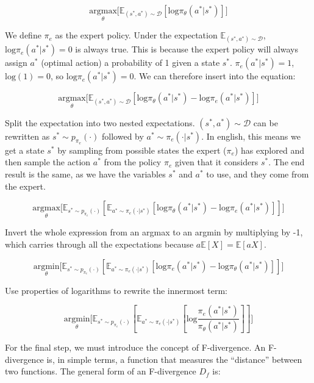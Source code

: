     $$\underset{\theta}{\textrm{argmax}}\biggl[\mathbb{E}_{(s^\ast,a^\ast) \sim \mathcal{D}}[\mathrm{log}\pi_\theta(a^\ast|s^\ast)]\biggr]$$

    We define $\pi_e$ as the expert policy. Under the expectation $\mathbb{E}_{(s^\ast,a^\ast) \sim \mathcal{D}}$, $\mathrm{log}\pi_e(a^\ast|s^\ast) = 0$ is always true. This is because the expert policy will always assign $a^\ast$ (optimal action) a probability of 1 given a state $s^\ast$. $\pi_e(a^\ast|s^\ast) = 1$, $\mathrm{log}(1) = 0$, so  $\mathrm{log}\pi_e(a^\ast|s^\ast) = 0$. We can therefore insert into the equation:

    $$\underset{\theta}{\textrm{argmax}}\biggl[\mathbb{E}_{(s^\ast,a^\ast) \sim \mathcal{D}}[\mathrm{log}\pi_\theta(a^\ast|s^\ast) - \mathrm{log}\pi_e(a^\ast|s^\ast)]\biggr]$$

    Split the expectation into two nested expectations. $(s^\ast,a^\ast) \sim \mathcal{D}$ can be rewritten as $s^\ast \sim p_{\pi_e}(\cdot)$ followed by $a^\ast \sim \pi_e(\cdot|s^\ast)$. In english, this means we get a state $s^\ast$ by sampling from possible states the expert ($\pi_e$) has explored and then sample the action $a^\ast$ from the policy $\pi_e$ given that it considers $s^\ast$. The end result is the same, as we have the variables $s^\ast$ and $a^\ast$ to use, and they come from the expert.

    $$\underset{\theta}{\textrm{argmax}}\biggl[\mathbb{E}_{s^\ast \sim p_{\pi_e}(\cdot)}[\mathbb{E}_{a^\ast \sim \pi_e(\cdot|s^\ast)}[\mathrm{log}\pi_\theta(a^\ast|s^\ast) - \mathrm{log}\pi_e(a^\ast|s^\ast)]]\biggr]$$

    Invert the whole expression from an argmax to an argmin by multiplying by -1, which carries through all the expectations because $a\mathbb{E}[X] = \mathbb{E}[aX]$.

    $$\underset{\theta}{\textrm{argmin}}\biggl[\mathbb{E}_{s^\ast \sim p_{\pi_e}(\cdot)}[\mathbb{E}_{a^\ast \sim \pi_e(\cdot|s^\ast)}[\mathrm{log}\pi_e(a^\ast|s^\ast) - \mathrm{log}\pi_\theta(a^\ast|s^\ast)]]\biggr]$$

    Use properties of logarithms to rewrite the innermost term:

    $$\underset{\theta}{\textrm{argmin}}\biggl[\mathbb{E}_{s^\ast \sim p_{\pi_e}(\cdot)}[\mathbb{E}_{a^\ast \sim \pi_e(\cdot|s^\ast)}[\mathrm{log}\frac{\pi_e(a^\ast|s^\ast)}{\pi_\theta(a^\ast|s^\ast)}]]\biggr]$$

    For the final step, we must introduce the concept of F-divergence. An F-divergence is, in simple terms, a function that measures the ``distance'' between two functions. The general form of an F-divergence $D_f$ is:

